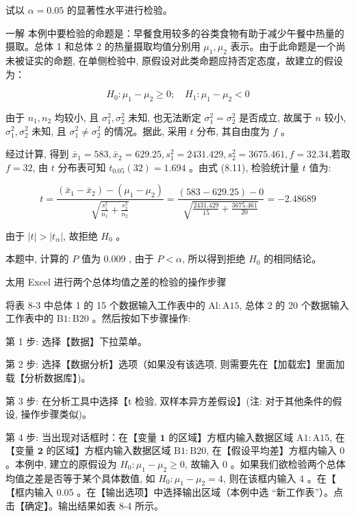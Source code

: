 \documentclass[10pt]{article}
\begin{document}
\begin{CJK*}{UTF8}{bsmi}
试以 $\alpha=0.05$ 的显著性水平进行检验。

一解 本例中要检验的命题是：早餐食用较多的谷类食物有助于减少午餐中热量的摄取。总体 1 和总体 2 的热量摄取均值分别用 $\mu_{1}, \mu_{2}$ 表示。由于此命题是一个尚未被证实的命题, 在单侧检验中, 原假设对此类命题应持否定态度，故建立的假设为：

$$
H_{0}: \mu_{1}-\mu_{2} \geqslant 0 ; \quad H_{1}: \mu_{1}-\mu_{2}<0
$$

由于 $n_{1}, n_{2}$ 均较小, 且 $\sigma_{1}^{2}, \sigma_{2}^{2}$ 未知, 也无法断定 $\sigma_{1}^{2}=\sigma_{2}^{2}$ 是否成立, 故属于 $n$ 较小, $\sigma_{1}^{2}, \sigma_{2}^{2}$ 未知, 且 $\sigma_{1}^{2} \neq \sigma_{2}^{2}$ 的情况。据此, 采用 $t$ 分布, 其自由度为 $f$ 。

经过计算, 得到 $\bar{x}_{1}=583, \bar{x}_{2}=629.25, s_{1}^{2}=2431.429, s_{2}^{2}=3675.461, f=32.34$,若取 $f=32$, 由 $t$ 分布表可知 $t_{0.05}(32)=1.694$ 。由式 (8.11), 检验统计量 $t$ 值为:

$$
t=\frac{\left(\bar{x}_{1}-\bar{x}_{2}\right)-\left(\mu_{1}-\mu_{2}\right)}{\sqrt{\frac{s_{1}^{2}}{n_{1}}+\frac{s_{2}^{2}}{n_{2}}}}=\frac{(583-629.25)-0}{\sqrt{\frac{2431.429}{15}+\frac{3675.461}{20}}}=-2.48689
$$

由于 $|t|>\left|t_{\alpha}\right|$, 故拒绝 $H_{0}$ 。

本题中, 计算的 $P$ 值为 0.009 , 由于 $P<\alpha$, 所以得到拒绝 $H_{0}$ 的相同结论。

太用 Excel 进行两个总体均值之差的检验的操作步骤

将表 8-3 中总体 1 的 15 个数据输入工作表中的 $\mathrm{Al}: \mathrm{A} 15$, 总体 2 的 20 个数据输入工作表中的 $\mathrm{B} 1: \mathrm{B} 20$ 。然后按如下步骤操作:

第 1 步: 选择【数据】下拉菜单。

第 2 步: 选择【数据分析】选项（如果没有该选项, 则需要先在【加载宏】里面加载【分析数据库】)。

第 3 步: 在分析工具中选择【t 检验, 双样本异方差假设】(注: 对于其他条件的假设, 操作步骤类似)。

第 4 步: 当出现对话框时：在【变量 $\mathbf{1}$ 的区域】方框内输入数据区域 $\mathrm{A} 1: \mathrm{A} 15$, 在【变量 $\mathbf{2}$ 的区域】方框内输入数据区域 $\mathrm{B} 1: \mathrm{B} 20$, 在【假设平均差】方框内输入 0 。本例中, 建立的原假设为 $H_{0}: \mu_{1}-\mu_{2} \geqslant 0$, 故输入 0 。如果我们欲检验两个总体均值之差是否等于某个具体数值, 如 $H_{0}: \mu_{1}-\mu_{2}=4$, 则在该框内输入 4 。在【 【框内输入 0.05 。在【输出选项】中选择输出区域（本例中选 “新工作表”）。点击【确定】。输出结果如表 8-4 所示。


\end{CJK*}
\end{document}
